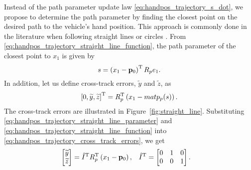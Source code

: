 Instead of the path parameter update law \eqref{eq:handpos_trajectory_s_dot}, we propose to determine the path parameter by finding the closest point on the desired path to the vehicle's hand position.
This approach is commonly done in the literature when following straight lines or circles \cite{breivik_path_following_2004}.
From \eqref{eq:handpos_trajectory_straight_line_function}, the path parameter of the closest point to $x_1$ is given by
\begin{equation}
    s = \left(x_1 - \mathbf{p}_0\right)^{\mathrm{T}} R_p e_1. \label{eq:handpos_trajectory_straight_line_parameter}
\end{equation}
In addition, let us define cross-track errors, $\widetilde{y}$ and $\widetilde{z}$, as
\begin{equation}
    \left[0, \widetilde{y}, \widetilde{z}\right]^{\mathrm{T}} = R_p^{\mathrm{T}} \left(x_1 - mat{p}_p(s)\right). \label{eq:handpos_trajectory_cross_track_errors}
\end{equation}
The cross-track errors are illustrated in Figure~\ref{fig:straight_line}.
Substituting \eqref{eq:handpos_trajectory_straight_line_parameter} and \eqref{eq:handpos_trajectory_straight_line_function} into \eqref{eq:handpos_trajectory_cross_track_errors}, we get
\begin{align}
    \begin{bmatrix} \widetilde{y} \\ \widetilde{z} \end{bmatrix} &= \hat{I}^{\mathrm{T}} R_p^{\mathrm{T}} \left(x_1 - \mathbf{p}_0\right), &
    \hat{I}^{\mathrm{T}} &= \begin{bmatrix} 0 & 1 & 0 \\ 0 & 0 & 1 \end{bmatrix}.
\end{align}

